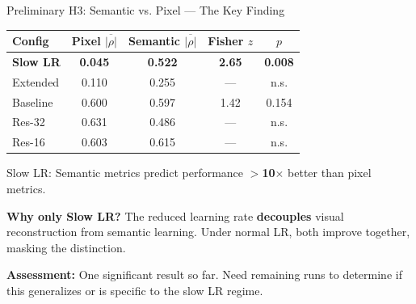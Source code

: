 \documentclass[aspectratio=169]{beamer}
\begin{document}
\begin{frame}{Preliminary H3: Semantic vs. Pixel --- The Key Finding}

\begin{table}
\centering
\begin{tabular}{lcccc}
\toprule
\textbf{Config} & \textbf{Pixel} $\overline{|\rho|}$ & \textbf{Semantic} $\overline{|\rho|}$ & \textbf{Fisher $z$} & $p$ \\
\midrule
\textbf{Slow LR} & \textbf{0.045} & \textbf{0.522} & \textbf{2.65} & \textbf{0.008} \\
Extended    & 0.110 & 0.255 & ---  & n.s. \\
Baseline    & 0.600 & 0.597 & 1.42 & 0.154 \\
Res-32      & 0.631 & 0.486 & ---  & n.s. \\
Res-16      & 0.603 & 0.615 & ---  & n.s. \\
\bottomrule
\end{tabular}
\end{table}

\vspace{0.3em}
Slow LR: Semantic metrics predict performance \textbf{$>$10$\times$} better than pixel metrics.

\vspace{0.3em}
\textbf{Why only Slow LR?} The reduced learning rate \textbf{decouples} visual reconstruction from semantic learning. Under normal LR, both improve together, masking the distinction.

\vspace{0.3em}
\textbf{Assessment:} One significant result so far. Need remaining runs to determine if this generalizes or is specific to the slow LR regime.
\end{frame}
\end{document}
